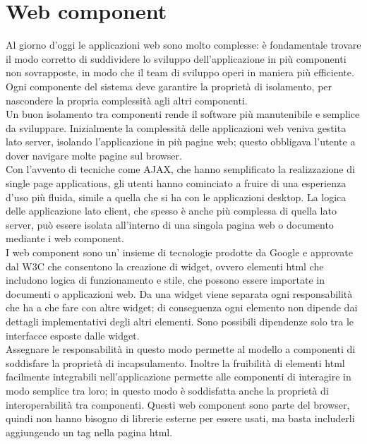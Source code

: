 \section{Web component}
\label{sec:chapter_tecnologie_abilitanti_webcomp_poly}

Al giorno d’oggi le applicazioni web sono molto complesse: è fondamentale trovare il modo corretto di suddividere lo sviluppo dell’applicazione in più componenti non sovrapposte, in modo che il team di sviluppo operi in maniera più efficiente. 
Ogni componente del sistema deve garantire la proprietà di isolamento, per nascondere la propria complessità agli altri componenti.
\\
Un buon isolamento tra componenti rende il software più manutenibile e semplice da sviluppare.
Inizialmente la complessità delle applicazioni web veniva gestita lato server, isolando l’applicazione in più pagine web; questo obbligava l’utente a dover navigare molte pagine sul browser.
\\
Con l’avvento di tecniche come AJAX, che hanno semplificato la realizzazione di single page applications, gli utenti hanno cominciato a fruire di una esperienza d’uso più fluida, simile a quella che si ha con le applicazioni desktop. 
La logica delle applicazione lato client, che spesso è anche più complessa di quella lato server, può essere isolata all’interno di una singola pagina web o documento mediante i web component.
\\
I web component sono un’ insieme di tecnologie prodotte da  Google e approvate dal W3C che consentono la creazione di widget, ovvero elementi html che includono logica di funzionamento e stile, che possono essere importate in documenti o applicazioni web. Da una widget viene separata ogni responsabilità che ha a che fare con altre widget; di conseguenza ogni elemento non dipende dai dettagli implementativi degli altri elementi. Sono possibili dipendenze solo tra le interfacce esposte dalle widget.
\\ 
Assegnare le responsabilità in questo modo permette al modello a componenti di soddisfare la proprietà di incapsulamento.
Inoltre la fruibilità di elementi html facilmente integrabili nell’applicazione permette alle componenti di interagire in modo semplice tra loro; in questo modo è soddisfatta anche la proprietà di interoperabilità tra componenti.
Questi web component sono parte del browser, quindi non hanno bisogno di librerie esterne per essere usati, ma basta includerli aggiungendo un tag nella pagina html.
\\ 
